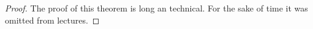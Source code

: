 \documentclass[11pt]{article}
\begin{document}
\begin{proof}
    The proof of this theorem is long an technical. For the sake of time it was omitted from lectures.
    
    
\end{proof}
\end{document}
